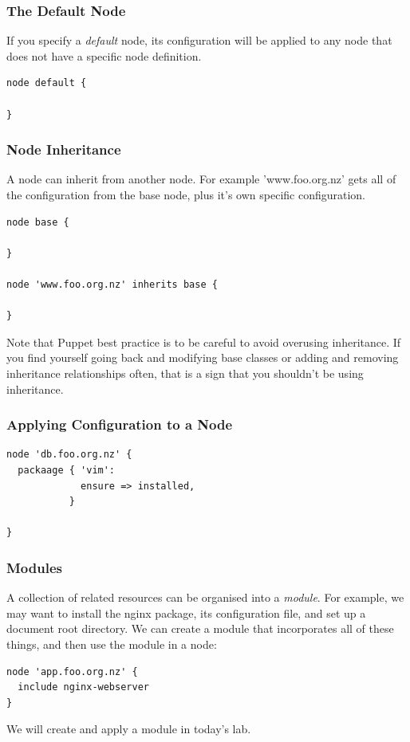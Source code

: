 \documentclass[10pt]{beamer}
\begin{document}
\begin{frame}[fragile]
  \frametitle{The Default Node}

If you specify a \emph{default} node, its configuration will be applied to any node that does not have a specific node definition.
\begin{verbatim}
node default {

}
\end{verbatim}


\end{frame}

\begin{frame}[fragile]
  \frametitle{Node Inheritance}

A node can inherit from another node.  For example 'www.foo.org.nz' gets all of the configuration from the base node, plus it's own specific configuration.

\begin{verbatim}
node base {

}

node 'www.foo.org.nz' inherits base {

}
\end{verbatim}

Note that Puppet best practice is to be careful to avoid overusing inheritance.  If you find yourself going back and modifying base classes or adding and removing inheritance relationships often, that is a sign that you shouldn't be using inheritance.

\end{frame}
\begin{frame}[fragile]
  \frametitle{Applying Configuration to a Node}



\begin{verbatim}
node 'db.foo.org.nz' {
  packaage { 'vim':
             ensure => installed,
           }  
              
}
\end{verbatim}


\end{frame}


\begin{frame}[fragile]
  \frametitle{Modules}
  A collection of related resources can be organised into a \emph{module}.  For example, we may want to install the nginx package, its configuration file, and set up a document root directory.  We can create a module that incorporates all of these things, and then use the module in a node:

\begin{verbatim}
node 'app.foo.org.nz' {
  include nginx-webserver
}
\end{verbatim}

We will create and apply a module in today's lab.



\end{frame}
\end{document}
